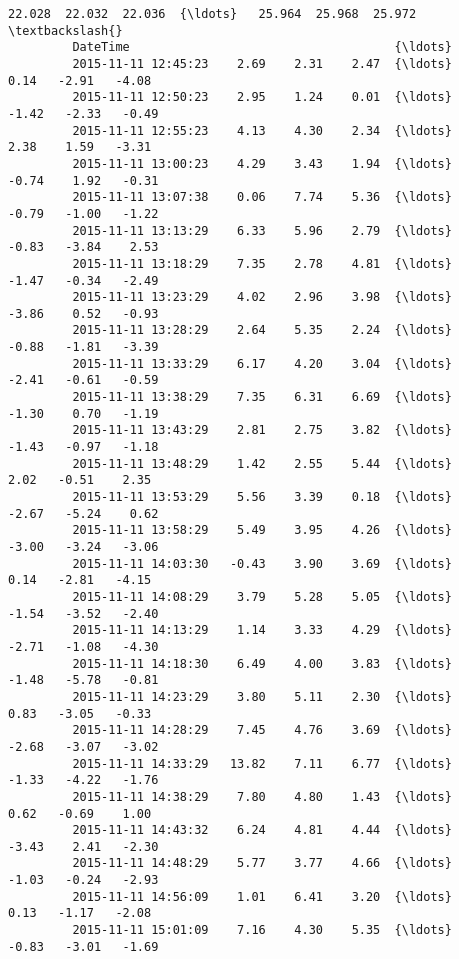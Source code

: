 \documentclass[a4paper,dvipdfmx]{jsarticle}
\begin{document}
\begin{Verbatim}[commandchars=\\\{\}]
                              22.028  22.032  22.036  {\ldots}   25.964  25.968  25.972  \textbackslash{}
         DateTime                                     {\ldots}                            
         2015-11-11 12:45:23    2.69    2.31    2.47  {\ldots}     0.14   -2.91   -4.08   
         2015-11-11 12:50:23    2.95    1.24    0.01  {\ldots}    -1.42   -2.33   -0.49   
         2015-11-11 12:55:23    4.13    4.30    2.34  {\ldots}     2.38    1.59   -3.31   
         2015-11-11 13:00:23    4.29    3.43    1.94  {\ldots}    -0.74    1.92   -0.31   
         2015-11-11 13:07:38    0.06    7.74    5.36  {\ldots}    -0.79   -1.00   -1.22   
         2015-11-11 13:13:29    6.33    5.96    2.79  {\ldots}    -0.83   -3.84    2.53   
         2015-11-11 13:18:29    7.35    2.78    4.81  {\ldots}    -1.47   -0.34   -2.49   
         2015-11-11 13:23:29    4.02    2.96    3.98  {\ldots}    -3.86    0.52   -0.93   
         2015-11-11 13:28:29    2.64    5.35    2.24  {\ldots}    -0.88   -1.81   -3.39   
         2015-11-11 13:33:29    6.17    4.20    3.04  {\ldots}    -2.41   -0.61   -0.59   
         2015-11-11 13:38:29    7.35    6.31    6.69  {\ldots}    -1.30    0.70   -1.19   
         2015-11-11 13:43:29    2.81    2.75    3.82  {\ldots}    -1.43   -0.97   -1.18   
         2015-11-11 13:48:29    1.42    2.55    5.44  {\ldots}     2.02   -0.51    2.35   
         2015-11-11 13:53:29    5.56    3.39    0.18  {\ldots}    -2.67   -5.24    0.62   
         2015-11-11 13:58:29    5.49    3.95    4.26  {\ldots}    -3.00   -3.24   -3.06   
         2015-11-11 14:03:30   -0.43    3.90    3.69  {\ldots}     0.14   -2.81   -4.15   
         2015-11-11 14:08:29    3.79    5.28    5.05  {\ldots}    -1.54   -3.52   -2.40   
         2015-11-11 14:13:29    1.14    3.33    4.29  {\ldots}    -2.71   -1.08   -4.30   
         2015-11-11 14:18:30    6.49    4.00    3.83  {\ldots}    -1.48   -5.78   -0.81   
         2015-11-11 14:23:29    3.80    5.11    2.30  {\ldots}     0.83   -3.05   -0.33   
         2015-11-11 14:28:29    7.45    4.76    3.69  {\ldots}    -2.68   -3.07   -3.02   
         2015-11-11 14:33:29   13.82    7.11    6.77  {\ldots}    -1.33   -4.22   -1.76   
         2015-11-11 14:38:29    7.80    4.80    1.43  {\ldots}     0.62   -0.69    1.00   
         2015-11-11 14:43:32    6.24    4.81    4.44  {\ldots}    -3.43    2.41   -2.30   
         2015-11-11 14:48:29    5.77    3.77    4.66  {\ldots}    -1.03   -0.24   -2.93   
         2015-11-11 14:56:09    1.01    6.41    3.20  {\ldots}     0.13   -1.17   -2.08   
         2015-11-11 15:01:09    7.16    4.30    5.35  {\ldots}    -0.83   -3.01   -1.69   

\end{Verbatim}
\end{document}
